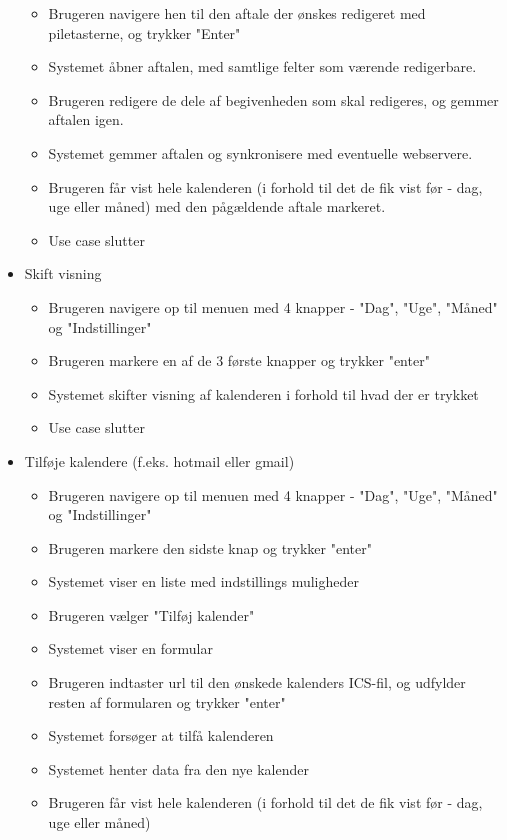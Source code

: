 \documentclass{article}
\begin{document}
\begin{itemize}
\begin{itemize}
   	\item Brugeren navigere hen til den aftale der ønskes redigeret med piletasterne, og trykker "Enter"
   	\item Systemet åbner aftalen, med samtlige felter som værende redigerbare.
   	\item Brugeren redigere de dele af begivenheden som skal redigeres, og gemmer aftalen igen.
   	\item Systemet gemmer aftalen og synkronisere med eventuelle webservere.
   	\item Brugeren får vist hele kalenderen (i forhold til det de fik vist før - dag, uge eller måned) med den pågældende aftale markeret.
   	\item Use case slutter
   	\end{itemize}
   
   \item Skift visning
   \begin{itemize}
   \item Brugeren navigere op til menuen med 4 knapper - "Dag", "Uge", "Måned" og "Indstillinger"
   \item Brugeren markere en af de 3 første knapper og trykker "enter"
   \item Systemet skifter visning af kalenderen i forhold til hvad der er trykket
   \item Use case slutter
   \end{itemize}
   \item Tilføje kalendere (f.eks. hotmail eller gmail)
   \begin{itemize}
   \item Brugeren navigere op til menuen med 4 knapper - "Dag", "Uge", "Måned" og "Indstillinger"
   \item Brugeren markere den sidste knap og trykker "enter"
   \item Systemet viser en liste med indstillings muligheder
   \item Brugeren vælger "Tilføj kalender"
   \item Systemet viser en formular
   \item Brugeren indtaster url til den ønskede kalenders ICS-fil, og udfylder resten af formularen og trykker "enter"
   \item Systemet forsøger at tilfå kalenderen
   \item Systemet henter data fra den nye kalender
   \item Brugeren får vist hele kalenderen (i forhold til det de fik vist før - dag, uge eller måned)

\end{itemize}
\end{itemize}
\end{document}
